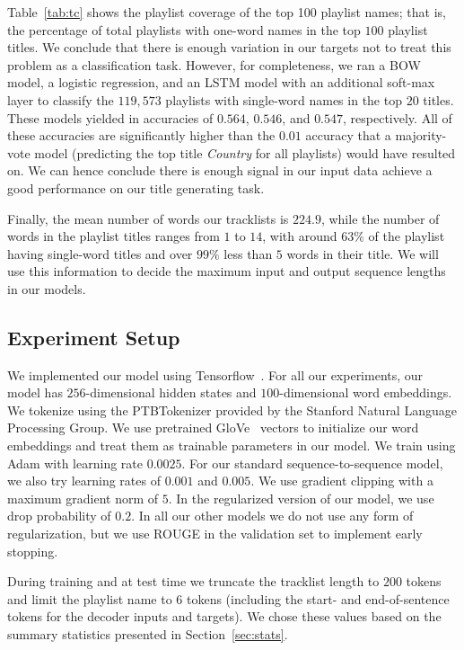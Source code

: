 \documentclass{article} %
\begin{document}
Table~\ref{tab:tc} shows the playlist coverage of the top 100 playlist names; that is, the percentage of total playlists with one-word names in the top $100$ playlist titles.
We conclude that there is enough variation in our targets not to treat this problem as a classification task.
However, for completeness, we ran a BOW model, a logistic regression, and an LSTM model with an additional soft-max layer to classify the $119,573$ playlists with single-word names in the top $20$ titles. 
These models yielded in accuracies of $0.564$, $0.546$, and $0.547$, respectively. 
All of these accuracies are significantly higher than the $0.01$ accuracy that a majority-vote model (predicting the top title \emph{Country} for all playlists) would have resulted on. 
We can hence conclude there is enough signal in our input data achieve a good performance on our title generating task.

Finally, the mean number of words our tracklists is $224.9$, while the number of words in the playlist titles ranges from $1$ to $14$, with around $63\%$ of the playlist having single-word titles and over $99\%$ less than $5$ words in their title. 
We will use this information to decide the maximum input and output sequence lengths in our models.

\subsection{Experiment Setup}
We implemented our model using Tensorflow~\cite{tensorflow2015-whitepaper}.
For all our experiments, our model has $256$-dimensional hidden states and $100$-dimensional word embeddings.
We tokenize using the PTBTokenizer provided by the Stanford Natural Language Processing Group.
We use pretrained GloVe~\cite{pennington2014glove} vectors to initialize our word embeddings and treat them as trainable parameters in our model.
We train using Adam with learning rate $0.0025$. 
For our standard sequence-to-sequence model, we also try learning rates of $0.001$ and $0.005$.
We use gradient clipping with a maximum gradient norm of $5$. 
In the regularized version of our model, we use drop probability of $0.2$.
In all our other models we do not use any form of regularization, but we use ROUGE in the validation set to implement early stopping. 

During training and at test time we truncate the tracklist length to $200$ tokens and limit the playlist name to $6$ tokens (including the start- and end-of-sentence tokens for the decoder inputs and targets).
We chose these values based on the summary statistics presented in Section~\ref{sec:stats}.
\end{document}
